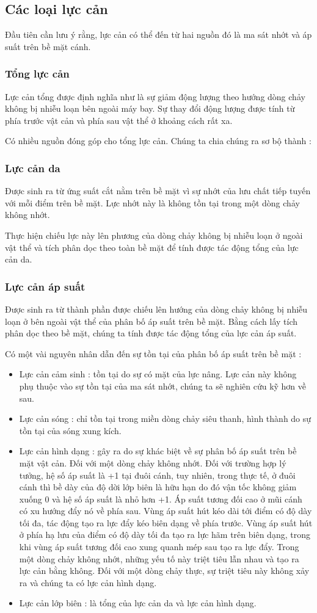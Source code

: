 \documentclass[KHI_DONG_HOC.tex]{subfiles}
\begin{document}
\subsection{Các loại lực cản}
Đầu tiên cần lưu ý rằng, lực cản có thể đến từ hai nguồn đó là ma sát nhớt và áp suất trên bề mặt cánh.
\subsubsection{Tổng lực cản}
Lực cản tổng được định nghĩa như là sự giảm động lượng theo hướng dòng chảy không bị nhiễu loạn bên ngoài máy bay. Sự thay đổi động lượng được tính từ phía trước vật cản và phía sau vật thể ở khoảng cách rất xa.

Có nhiều nguồn đóng góp cho tổng lực cản. Chúng ta chia chúng ra sơ bộ thành :
\subsubsection{Lực cản da}
Được sinh ra từ ứng suất cắt nằm trên bề mặt vì sự nhớt của lưu chất tiếp tuyến với mỗi điểm trên bề mặt. Lực nhớt này là không tồn tại trong một dòng chảy không nhớt.

Thực hiện chiếu lực này lên phương của dòng chảy không bị nhiễu loạn ở ngoài vật thể và tích phân dọc theo toàn bề mặt để tính được tác động tổng của lực cản da.
\subsubsection{Lực cản áp suất}
Được sinh ra từ thành phần được chiếu lên hướng của dòng chảy không bị nhiễu loạn ở bên ngoài vật thể của phân bố áp suất trên bề mặt. Bằng cách lấy tích phân dọc theo bề mặt, chúng ta tính được tác động tổng của lực cản áp suất.

Có một vài nguyên nhân dẫn đến sự tồn tại của phân bố áp suất trên bề mặt :
\begin{itemize}
	\item Lực cản cảm sinh : tồn tại do sự có mặt của lực nâng. Lực cản này không phụ thuộc vào sự tồn tại của ma sát nhớt, chúng ta sẽ nghiên cứu kỹ hơn về sau.
	\item Lực cản sóng : chỉ tồn tại trong miền dòng chảy siêu thanh, hình thành do sự tồn tại của sóng xung kích.
	\item Lực cản hình dạng : gây ra do sự khác biệt về sự phân bố áp suất trên bề mặt vật cản. Đối với một dòng chảy không nhớt. Đối với trường hợp lý tưởng, hệ số áp suất là +1 tại đuôi cánh, tuy nhiên, trong thực tế, ở đuôi cánh thì bề dày của độ dời lớp biên là hữu hạn do đó vận tốc không giảm xuống 0 và hệ số áp suất là nhỏ hơn +1. Áp suất tương đối cao ở mũi cánh có xu hướng đẩy nó về phía sau. Vùng áp suất hút kéo dài tới điểm có độ dày tối đa, tác động tạo ra lực đẩy kéo biên dạng về phía trước. Vùng áp suất hút ở phía hạ lưu của điểm có độ dày tối đa tạo ra lực hãm trên biên dạng, trong khi vùng áp suất tương đối cao xung quanh mép sau tạo ra lực đẩy. Trong một dòng chảy không nhớt, những yếu tố này triệt tiêu lẫn nhau và tạo ra lực cản bằng không. Đối với một dòng chảy thực, sự triệt tiêu này không xảy ra và chúng ta có lực cản hình dạng.
	\item Lực cản lớp biên : là tổng của lực cản da và lực cản hình dạng.
\end{itemize}
\end{document}
